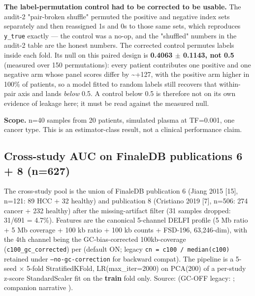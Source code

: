 \documentclass[11pt]{article}
\begin{document}
\textbf{The label-permutation control had to be corrected to be usable.} The audit-2 "pair-broken shuffle" permuted the positive and negative index sets separately and then reassigned 1s and 0s to those same sets, which reproduces \texttt{y\_\allowbreak{}true} exactly --- the control was a no-op, and the "shuffled" numbers in the audit-2 table are the honest numbers. The corrected control permutes labels inside each fold. Its null on this paired design is \textbf{0.4063 $\pm$ 0.1143, not 0.5} (measured over 150 permutations): every patient contributes one positive and one negative arm whose panel scores differ by \textasciitilde{}+127, with the positive arm higher in 100\% of patients, so a model fitted to random labels still recovers that within-pair axis and lands \textit{below} 0.5. A control below 0.5 is therefore not on its own evidence of leakage here; it must be read against the measured null.

\textbf{Scope.} n=\allowbreak{}40 samples from 20 patients, simulated plasma at TF=\allowbreak{}0.001, one cancer type. This is an estimator-class result, not a clinical performance claim.

\subsection{Cross-study AUC on FinaleDB publications 6 + 8 (n=\allowbreak{}627)}
The cross-study pool is the union of FinaleDB publication 6 (Jiang 2015 [15], n=\allowbreak{}121: 89 HCC + 32 healthy) and publication 8 (Cristiano 2019 [7], n=\allowbreak{}506: 274 cancer + 232 healthy) after the missing-artifact filter (31 samples dropped: 31/691 =\allowbreak{} 4.7\%). Features are the canonical 5-channel DELFI profile (5 Mb ratio + 5 Mb coverage + 100 kb ratio + 100 kb counts + FSD-196, 63,246-dim), with the 4th channel being the GC-bias-corrected 100kb-coverage (\texttt{c100\_\allowbreak{}gc\_\allowbreak{}corrected}) per  (default ON; legacy \texttt{cn = c100 /\allowbreak{} median(c100)} retained under \texttt{--no-gc-correction} for backward compat). The pipeline is a 5-seed $\times$ 5-fold StratifiedKFold, LR(max\_iter=\allowbreak{}2000) on PCA(200) of a per-study z-score StandardScaler fit on the \textbf{train} fold only. Source:  (GC-OFF legacy: ; companion narrative ).
\end{document}
